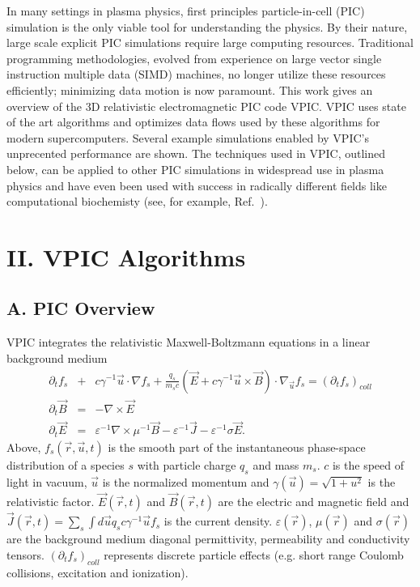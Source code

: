 \documentclass[aps,prl,preprint,preprintnumbers,groupedaddress]{revtex4}
\newcommand{\eps}{\varepsilon}
\newcommand{\vecr}{\vec{r}}
\newcommand{\vecu}{\vec{u}}
\newcommand{\vecJ}{\vec{J}}
\newcommand{\vecE}{\vec{E}}
\newcommand{\vecB}{\vec{B}}
\newcommand{\PDeriv}[2]{\partial_{#2}#1}
\newcommand{\DotP}[2]{#1 \cdot #2}
\newcommand{\CrossP}[2]{#1 \times #2}
\newcommand{\Grad}[1]{\nabla #1}
\newcommand{\Curl}[1]{\nabla \times #1}
\newcommand{\Gradu}[1]{\nabla_{\vecu} #1}
\begin{document}
In many settings in plasma physics, first principles particle-in-cell
(PIC) simulation \cite{Birdsall_Langdon_1985,Hockney_Eastwood_1988} is
the only viable tool for understanding the physics.  By their nature,
large scale explicit PIC simulations require large computing
resources.  Traditional programming methodologies, evolved from
experience on large vector single instruction multiple data (SIMD)
machines, no longer utilize these resources efficiently; minimizing
data motion is now paramount.  This work gives an overview of the 3D
relativistic electromagnetic PIC code VPIC.  VPIC uses state of the
art algorithms and optimizes data flows used by these algorithms for
modern supercomputers.  Several example simulations enabled by VPIC's
unprecented performance are shown.  The techniques used in VPIC,
outlined below, can be applied to other PIC simulations in widespread
use in plasma physics and have even been used with success in
radically different fields like computational biochemisty (see, for
example, Ref.~\cite{Bowers_et_al_2006}).

\section{II. VPIC Algorithms}

\subsection{A. PIC Overview}

VPIC integrates the relativistic Maxwell-Boltzmann equations in a
linear background medium
\begin{eqnarray}
\PDeriv{f_s}{t} &+& 
\DotP{c\gamma^{-1}\vecu}{\Grad{f_s}} +
\DotP{\frac{q_s}{m_s c}\left(\vecE+\CrossP{c\gamma^{-1}\vecu}{\vecB}\right)}
{\Gradu{f_s}} = \left(\PDeriv{f_s}{t}\right)_{coll} \label{eq:Boltzmann}\\
\PDeriv{\vecB}{t} &=& -\Curl{\vecE} \label{eq:Faraday}\\
\PDeriv{\vecE}{t} &=&
\eps^{-1}\Curl{\mu^{-1}\vecB} - \eps^{-1}\vecJ - \eps^{-1}\sigma\vecE
\label{eq:Ampere}
.
\end{eqnarray}
Above, $f_s\left(\vecr,\vecu,t\right)$ is the smooth part of the
instantaneous phase-space distribution of a species $s$ with particle
charge $q_s$ and mass $m_s$.  $c$ is the speed of light in vacuum,
$\vecu$ is the normalized momentum and $\gamma\left(\vecu\right) =
\sqrt{1 + u^2}$ is the relativistic factor.
$\vecE\left(\vecr,t\right)$ and $\vecB\left(\vecr,t\right)$ are the
electric and magnetic field and $\vecJ\left(\vecr,t\right) =
\sum_s \int d\vecu q_s c\gamma^{-1}\vecu f_s$ is the current
density.  $\eps\left(\vecr\right)$, $\mu\left(\vecr\right)$ and
$\sigma\left(\vecr\right)$ are the background medium diagonal
permittivity, permeability and conductivity tensors.
$\left(\PDeriv{f_s}{t}\right)_{coll}$ represents discrete
particle effects (e.g. short range Coulomb collisions, excitation and
ionization).
\end{document}
